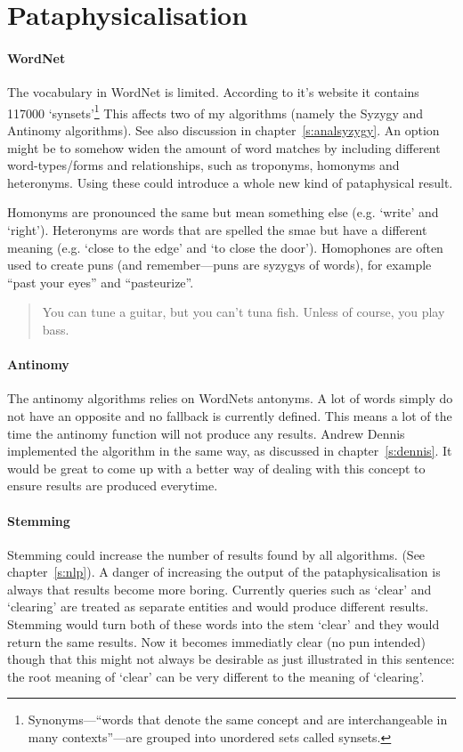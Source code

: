 \documentclass[11pt]{thesis} %
\begin{document}
\section{Pataphysicalisation}

\paragraph{WordNet}
The vocabulary in WordNet is limited. According to it's website \autocite{Princeton2010} it contains \num{117000} `synsets'\footnote{Synonyms---``words that denote the same concept and are interchangeable in many contexts''---are grouped into unordered sets called synsets.} This affects two of my algorithms (namely the Syzygy and Antinomy algorithms). See also discussion in chapter~\ref{s:analsyzygy}. An option might be to somehow widen the amount of word matches by including different word-types/forms and relationships, such as troponyms, homonyms and heteronyms. Using these could introduce a whole new kind of pataphysical result. 

Homonyms are pronounced the same but mean something else (e.g. `write' and `right'). Heteronyms are words that are spelled the smae but have a different meaning (e.g. `close to the edge' and `to close the door'). Homophones are often used to create puns (and remember---puns are syzygys of words), for example ``past your eyes'' and ``pasteurize''. 

\begin{quotation}
   You can tune a guitar, but you can't tuna fish. Unless of course, you play bass. 
\end{quotation}

\paragraph{Antinomy}
The antinomy algorithms relies on WordNets antonyms. A lot of words simply do not have an opposite and no fallback is currently defined. This means a lot of the time the antinomy function will not produce any results. Andrew Dennis implemented the algorithm in the same way, as discussed in chapter~\ref{s:dennis}. It would be great to come up with a better way of dealing with this concept to ensure results are produced everytime.

\paragraph{Stemming}
Stemming could increase the number of results found by all algorithms. (See chapter~\ref{s:nlp}). A danger of increasing the output of the pataphysicalisation is always that results become more boring. Currently queries such as `clear' and `clearing' are treated as separate entities and would produce different results. Stemming would turn both of these words into the stem `clear' and they would return the same results. Now it becomes immediatly clear (no pun intended) though that this might not always be desirable as just illustrated in this sentence: the root meaning of `clear' can be very different to the meaning of `clearing'.
\end{document}
